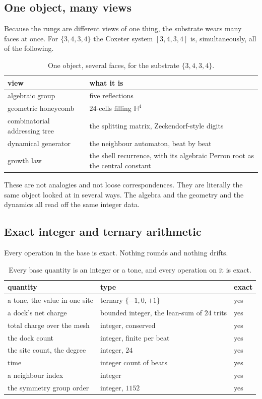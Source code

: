 \subsection{One object, many views}

Because the rungs are different views of one thing, the substrate wears many faces at once. For $\{3,4,3,4\}$ the Coxeter system $[3,4,3,4]$ is, simultaneously, all of the following.

\begin{table}[ht]
\centering
\begin{tabular}{@{}ll@{}}
\toprule
view & what it is \\
\midrule
algebraic group & five reflections \\
geometric honeycomb & $24$-cells filling $\mathbb{H}^4$ \\
combinatorial addressing tree & the splitting matrix, Zeckendorf-style digits \\
dynamical generator & the neighbour automaton, beat by beat \\
growth law & the shell recurrence, with its algebraic Perron root as the central constant \\
\bottomrule
\end{tabular}
\caption{One object, several faces, for the substrate $\{3,4,3,4\}$.}
\label{tab:many-views}
\end{table}

These are not analogies and not loose correspondences. They are literally the same object looked at in several ways. The algebra and the geometry and the dynamics all read off the same integer data.

\subsection{Exact integer and ternary arithmetic}

Every operation in the base is exact. Nothing rounds and nothing drifts.

\begin{table}[ht]
\centering
\begin{tabular}{@{}lll@{}}
\toprule
quantity & type & exact \\
\midrule
a tone, the value in one site & ternary $\{-1, 0, +1\}$ & yes \\
a dock's net charge & bounded integer, the lean-sum of $24$ trits & yes \\
total charge over the mesh & integer, conserved & yes \\
the dock count & integer, finite per beat & yes \\
the site count, the degree & integer, $24$ & yes \\
time & integer count of beats & yes \\
a neighbour index & integer & yes \\
the symmetry group order & integer, $1152$ & yes \\
\bottomrule
\end{tabular}
\caption{Every base quantity is an integer or a tone, and every operation on it is exact.}
\label{tab:exact-arithmetic}
\end{table}

